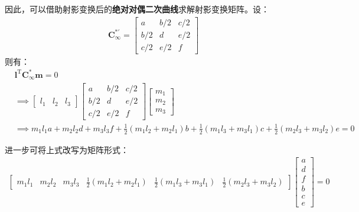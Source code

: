 \documentclass[11pt]{article}
\begin{document}
\par
因此，可以借助射影变换后的\textbf{绝对对偶二次曲线}求解射影变换矩阵。设：
\begin{align*}
  \mathbf{C_\infty^{*'}}=\begin{bmatrix}
                           a   & b/2 & c/2 \\
                           b/2 & d   & e/2 \\
                           c/2 & e/2 & f
                         \end{bmatrix}
\end{align*}
则有：
\begin{align*}
   & \mathbf{l^\mathrm{T}C_\infty^{*}m}=0                                                                                    \\
   & \implies\begin{bmatrix}
               l_1 & l_2 & l_3
             \end{bmatrix}\begin{bmatrix}
                            a   & b/2 & c/2 \\
                            b/2 & d   & e/2 \\
                            c/2 & e/2 & f
                          \end{bmatrix}
  \begin{bmatrix}
    m_1 \\
    m_2 \\
    m_3
  \end{bmatrix}                                                                                                            \\
   & \implies m_1l_1a+m_2l_2d+m_3l_3f+\frac{1}{2}(m_1l_2+m_2l_1)b+\frac{1}{2}(m_1l_3+m_3l_1)c+\frac{1}{2}(m_2l_3+m_3l_2)e=0
\end{align*}\par
进一步可将上式改写为矩阵形式：
\begin{align}
  \begin{bmatrix}
    m_1l_1 & m_2l_2 & m_3l_3 & \frac{1}{2}(m_1l_2+m_2l_1 ) & \frac{1}{2}(m_1l_3+m_3l_1) & \frac{1}{2}(m_2l_3+m_3l_2)
  \end{bmatrix}\begin{bmatrix}
                 a \\
                 d \\
                 f \\
                 b \\
                 c \\
                 e
               \end{bmatrix}=0
  \label{eq:line}
\end{align}
\end{document}
